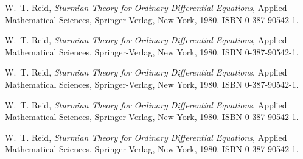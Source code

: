 \begin{thebibliography}{10}
W.~T. Reid, \textit{Sturmian Theory for Ordinary Differential Equations}, Applied 
  Mathematical Sciences, Springer-Verlag, New York, 1980. 
  ISBN 0-387-90542-1.

W.~T. Reid, \textit{Sturmian Theory for Ordinary Differential Equations}, Applied 
  Mathematical Sciences, Springer-Verlag, New York, 1980. 
  ISBN 0-387-90542-1.
  
W.~T. Reid, \textit{Sturmian Theory for Ordinary Differential Equations}, Applied 
  Mathematical Sciences, Springer-Verlag, New York, 1980. 
  ISBN 0-387-90542-1.
  
W.~T. Reid, \textit{Sturmian Theory for Ordinary Differential Equations}, Applied 
  Mathematical Sciences, Springer-Verlag, New York, 1980. 
  ISBN 0-387-90542-1.
               
W.~T. Reid, \textit{Sturmian Theory for Ordinary Differential Equations}, Applied 
  Mathematical Sciences, Springer-Verlag, New York, 1980. 
  ISBN 0-387-90542-1.
        
    
\end{thebibliography}

\cleardoublepage

